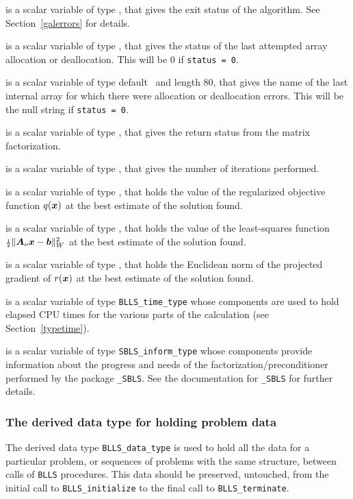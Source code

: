 \documentclass{galahad}
\newcommand{\packagename}{BLLS}
\begin{document}
\begin{description}

 is a scalar variable of type \integer, that gives the
exit status of the algorithm.
See Section~\ref{galerrors}
for details.

 is a scalar variable of type \integer, that gives
the status of the last attempted array allocation or deallocation.
This will be 0 if {\tt status = 0}.

 is a scalar variable of type default \character\
and length 80, that  gives the name of the last internal array
for which there were allocation or deallocation errors.
This will be the null string if {\tt status = 0}.

 is a scalar variable of type \integer, that
gives the return status from the matrix factorization.

 is a scalar variable of type \integer, that
gives the number of iterations performed.

 is a scalar variable of type \realdp, that holds the
value of the regularized objective function $q({\bm{x}})$ at the 
best estimate of the solution found.

 is a scalar variable of type \realdp, that holds the value of 
the least-squares function ${\scriptstyle \frac{1}{2}} \| {\bm{A}}_o {\bm{x}} - {\bm{b}}\|_W^2$ 
at the best estimate of the solution found.

 is a scalar variable of type \realdp, that holds the
Euclidean norm of the projected gradient of $r({\bm{x}})$ at the best 
estimate of the solution found.

 is a scalar variable of type {\tt \packagename\_time\_type}
whose components are used to hold elapsed CPU times for the various parts
of the calculation (see Section~\ref{typetime}).

 is a scalar variable of type
{\tt SBLS\_inform\_type} %
whose components provide information about the progress and needs
of the factorization/preconditioner
performed by the package
{\tt \libraryname\_SBLS}.
See the documentation for {\tt \libraryname\_SBLS} for further details.

\end{description}


\subsubsection{The derived data type for holding problem data}\label{typedata}
The derived data type
{\tt \packagename\_data\_type}
is used to hold all the data for a particular problem,
or sequences of problems with the same structure, between calls of
{\tt \packagename} procedures.
This data should be preserved, untouched, from the initial call to
{\tt \packagename\_initialize}
to the final call to
{\tt \packagename\_terminate}.
\end{document}
